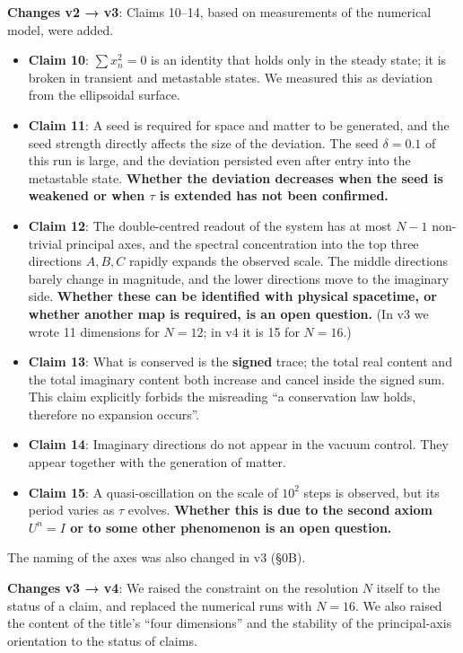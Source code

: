 \documentclass[
  10pt,
]{article}
\providecommand{\tightlist}{%
  \setlength{\itemsep}{0pt}\setlength{\parskip}{0pt}}
\begin{document}
\textbf{Changes v2 → v3}: Claims 10--14, based on measurements of the
numerical model, were added.

\begin{itemize}
\tightlist
\item
  \textbf{Claim 10}: \(\sum x_n^2 = 0\) is an identity that holds only
  in the steady state; it is broken in transient and metastable states.
  We measured this as deviation from the ellipsoidal surface.
\item
  \textbf{Claim 11}: A seed is required for space and matter to be
  generated, and the seed strength directly affects the size of the
  deviation. The seed \(\delta = 0.1\) of this run is large, and the
  deviation persisted even after entry into the metastable state.
  \textbf{Whether the deviation decreases when the seed is weakened or
  when \(\tau\) is extended has not been confirmed.}
\item
  \textbf{Claim 12}: The double-centred readout of the system has at
  most \(N-1\) non-trivial principal axes, and the spectral
  concentration into the top three directions \(A,B,C\) rapidly expands
  the observed scale. The middle directions barely change in magnitude,
  and the lower directions move to the imaginary side. \textbf{Whether
  these can be identified with physical spacetime, or whether another
  map is required, is an open question.} (In v3 we wrote 11 dimensions
  for \(N=12\); in v4 it is 15 for \(N=16\).)
\item
  \textbf{Claim 13}: What is conserved is the \textbf{signed} trace; the
  total real content and the total imaginary content both increase and
  cancel inside the signed sum. This claim explicitly forbids the
  misreading ``a conservation law holds, therefore no expansion
  occurs''.
\item
  \textbf{Claim 14}: Imaginary directions do not appear in the vacuum
  control. They appear together with the generation of matter.
\item
  \textbf{Claim 15}: A quasi-oscillation on the scale of \(10^2\) steps
  is observed, but its period varies as \(\tau\) evolves.
  \textbf{Whether this is due to the second axiom \(U^n = I\) or to some
  other phenomenon is an open question.}
\end{itemize}

The naming of the axes was also changed in v3 (§0B).

\textbf{Changes v3 → v4}: We raised the constraint on the resolution
\(N\) itself to the status of a claim, and replaced the numerical runs
with \(N=16\). We also raised the content of the title's ``four
dimensions'' and the stability of the principal-axis orientation to the
status of claims.
\end{document}
